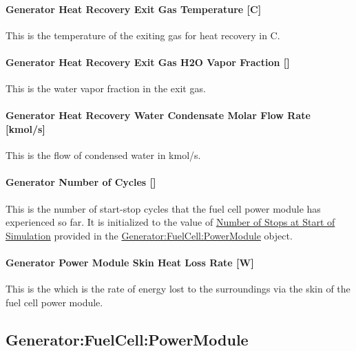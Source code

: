 \paragraph{Generator Heat Recovery Exit Gas Temperature {[}C{]}}\label{generator-heat-recovery-exit-gas-temperature-c}

This is the temperature of the exiting gas for heat recovery in C.

\paragraph{Generator Heat Recovery Exit Gas H2O Vapor Fraction {[]}}\label{generator-heat-recovery-exit-gas-h2o-vapor-fraction}

This is the water vapor fraction in the exit gas.

\paragraph{Generator Heat Recovery Water Condensate Molar Flow Rate {[}kmol/s{]}}\label{generator-heat-recovery-water-condensate-molar-flow-rate-kmols}

This is the flow of condensed water in kmol/s.

\paragraph{Generator Number of Cycles {[]}}\label{generator-number-of-cycles}

This is the number of start-stop cycles that the fuel cell power module has experienced so far.
It is initialized to the value of \hyperref[field-number-of-stops-at-start-of-simulation]{Number of Stops at Start of Simulation} provided in the \hyperref[generatorfuelcellpowermodule]{Generator:FuelCell:PowerModule} object.

\paragraph{Generator Power Module Skin Heat Loss Rate {[}W{]}}\label{generator-power-module-skin-heat-loss-rate-w}

This is the which is the rate of energy lost to the surroundings via the skin of the fuel cell power module.


\subsection{Generator:FuelCell:PowerModule}\label{generatorfuelcellpowermodule}

